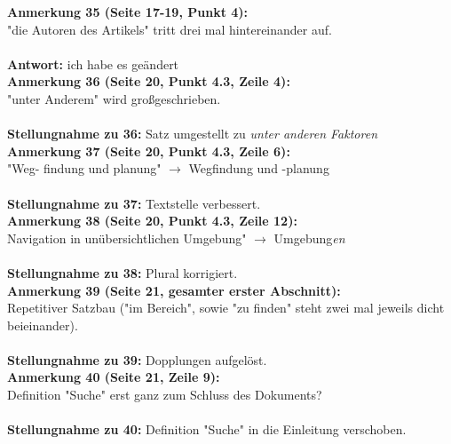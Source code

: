 \documentclass[a4paper,12pt]{book}
\begin{document}
\noindent
\textbf{Anmerkung 35 (Seite 17-19, Punkt 4):}\\
"die Autoren des Artikels" tritt drei mal hintereinander auf. \\ \\
\textbf{Antwort:} ich habe es geändert
\\

\noindent
\textbf{Anmerkung 36 (Seite 20, Punkt 4.3, Zeile 4):}\\
"unter Anderem" wird großgeschrieben.\\
\\
\textbf{Stellungnahme zu 36:}
Satz umgestellt zu \emph{unter anderen Faktoren}\\

\noindent
\textbf{Anmerkung 37 (Seite 20, Punkt 4.3, Zeile 6):}\\
"Weg- findung und planung" $\rightarrow$ Wegfindung und -planung \\
\\
\textbf{Stellungnahme zu 37:}
Textstelle verbessert.
\\

\noindent
\textbf{Anmerkung 38 (Seite 20, Punkt 4.3, Zeile 12):}\\
Navigation in unübersichtlichen Umgebung" $\rightarrow$ Umgebung\emph{en} \\
\\
\textbf{Stellungnahme zu 38:}
Plural korrigiert.
\\

\noindent
\textbf{Anmerkung 39 (Seite 21, gesamter erster Abschnitt):}\\
Repetitiver Satzbau ("im Bereich", sowie "zu finden" steht zwei mal jeweils dicht beieinander). \\
\\
\textbf{Stellungnahme zu 39:}
Dopplungen aufgelöst.
\\

\noindent
\textbf{Anmerkung 40 (Seite 21, Zeile 9):}\\
Definition "Suche" erst ganz zum Schluss des Dokuments? 
\\ \\
\textbf{Stellungnahme zu 40:}
Definition  "Suche" in die Einleitung verschoben.
\\ \\
\end{document}
